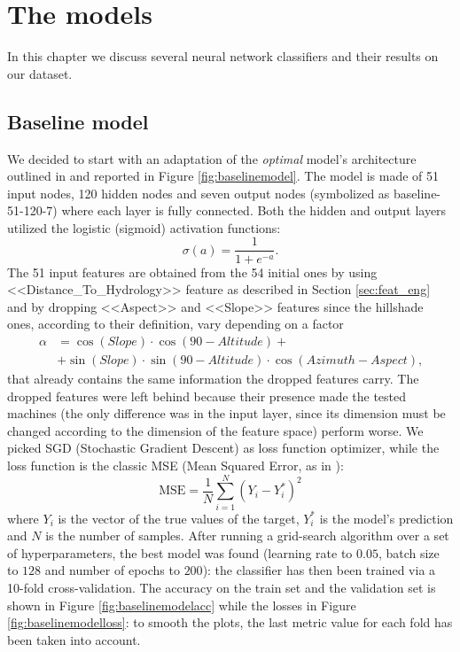 \chapter{The models}
In this chapter we discuss several neural network classifiers and their results on our dataset.
\section{Baseline model}
\label{sec:baselinemodel}
We decided to start with an adaptation of the \textit{optimal} model's architecture outlined in \cite{blackardDean} and reported in Figure \ref{fig:baselinemodel}. The model is made of 51 input nodes, 120 hidden nodes and seven output nodes (symbolized as baseline-51-120-7) where each layer is fully connected. Both the hidden and output layers utilized the logistic (sigmoid) activation functions:
$$
\sigma(a) = \frac{1}{1 + e^{-a}}\text{.}
$$
The 51 input features are obtained from the 54 initial ones by using <<Distance\_To\_Hydrology>> feature as described in Section \ref{sec:feat_eng} and by dropping <<Aspect>> and <<Slope>> features since the hillshade ones, according to their definition, vary depending on a factor
\begin{equation}
\begin{aligned}
\alpha&=\cos(Slope)\cdot \cos(90-Altitude)+ \\
& +\sin(Slope) \cdot \sin(90-Altitude)\cdot \cos(Azimuth-Aspect)\text{,}
\end{aligned}
\end{equation}
that already contains the same information the dropped features carry. The dropped features were left behind because their presence made the tested machines (the only difference was in the input layer, since its dimension must be changed according to the dimension of the feature space) perform worse. We picked SGD (Stochastic Gradient Descent) as loss function optimizer, while the loss function is the classic MSE (Mean Squared Error, as in \cite{blackardDean}):
\begin{equation}
\text{MSE} = \frac{1}{N}\sum_{i=1}^{N}(Y_i - Y^{*}_{i})^2
\end{equation}
where $Y_i$ is the vector of the true values of the target, $Y^{*}_{i}$ is the model's prediction and $N$ is the number of samples. After running a grid-search algorithm over a set of hyperparameters, the best model was found (learning rate to $0.05$, batch size to $128$ and number of epochs to $200$): the classifier has then been trained via a 10-fold cross-validation. The accuracy on the train set and the validation set is shown in Figure \ref{fig:baselinemodelacc} while the losses in Figure \ref{fig:baselinemodelloss}: to smooth the plots, the last metric value for each fold has been taken into account.
